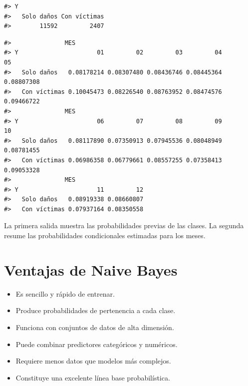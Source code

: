 \documentclass[
  spanish,
  10.5pt,
  letterpaper,
  openany,
  headings=big]{scrbook}
\newenvironment{Shaded}{}{}
\newcommand{\NormalTok}[1]{\textcolor[rgb]{0.14,0.16,0.18}{#1}}
\newcommand{\SpecialCharTok}[1]{\textcolor[rgb]{0.00,0.36,0.77}{#1}}
\providecommand{\tightlist}{%
  \setlength{\itemsep}{0pt}\setlength{\parskip}{0pt}}
\begin{document}
\begin{Shaded}
\end{Shaded}

\begin{verbatim}
#> Y
#>   Solo daños Con víctimas 
#>        11592         2407
\end{verbatim}

\begin{Shaded}
\end{Shaded}

\begin{verbatim}
#>               MES
#> Y                      01         02         03         04         05
#>   Solo daños   0.08178214 0.08307480 0.08436746 0.08445364 0.08807308
#>   Con víctimas 0.10045473 0.08226540 0.08763952 0.08474576 0.09466722
#>               MES
#> Y                      06         07         08         09         10
#>   Solo daños   0.08117890 0.07350913 0.07945536 0.08048949 0.08781455
#>   Con víctimas 0.06986358 0.06779661 0.08557255 0.07358413 0.09053328
#>               MES
#> Y                      11         12
#>   Solo daños   0.08919338 0.08660807
#>   Con víctimas 0.07937164 0.08350558
\end{verbatim}

La primera salida muestra las probabilidades previas de las clases. La
segunda resume las probabilidades condicionales estimadas para los
meses.

\section{Ventajas de Naive Bayes}\label{ventajas-de-naive-bayes}

\begin{itemize}
\tightlist
\item
  Es sencillo y rápido de entrenar.
\item
  Produce probabilidades de pertenencia a cada clase.
\item
  Funciona con conjuntos de datos de alta dimensión.
\item
  Puede combinar predictores categóricos y numéricos.
\item
  Requiere menos datos que modelos más complejos.
\item
  Constituye una excelente línea base probabilística.
\end{itemize}
\end{document}
